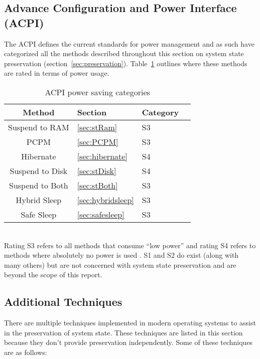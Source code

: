 \documentclass[a4paper,12pt]{article}
\begin{document}
\subsection{Advance Configuration and Power Interface (ACPI)}
The ACPI defines the current standards for power management \citep{ACPI} and as such have categorized all the methods described throughout this section on system state preservation (section~\ref{sec:preservation}). Table~\ref{table:categories} outlines where these methods are rated in terms of power usage.
\begin{table}[h!]
    \begin{center}
        \leavevmode
        \begin{tabular}{|cll|l|}\hline
            Method & Section & Category\\[0.1cm]\hline
            Suspend to RAM & \ref{sec:stRam} & S3\\
            PCPM & \ref{sec:PCPM} & S3 \\
            Hibernate & \ref{sec:hibernate} & S4\\
            Suspend to Disk & \ref{sec:stDisk} & S4 \\
            Suspend to Both & \ref{sec:stBoth} & S3 \\
            Hybrid Sleep & \ref{sec:hybridsleep} & S3 \\
            Safe Sleep & \ref{sec:safesleep} & S3 \\\hline
        \end{tabular}
    \end{center}
    \caption{ACPI power saving categories \citep{ACPI}}
    \label{table:categories}
\end{table}
\\Rating S3 refers to all methods that consume ``low power'' and rating S4 refers to methods where absolutely no power is used \citep{ACPI}. S1 and S2 do exist (along with many others) but are not concerned with system state preservation and are beyond the scope of this report.

\subsection{Additional Techniques}
There are multiple techniques implemented in modern operating systems to assist in the preservation of system state. These techniques are listed in this section because they don't provide preservation independently.
Some of these techniques are as follows:
\end{document}
